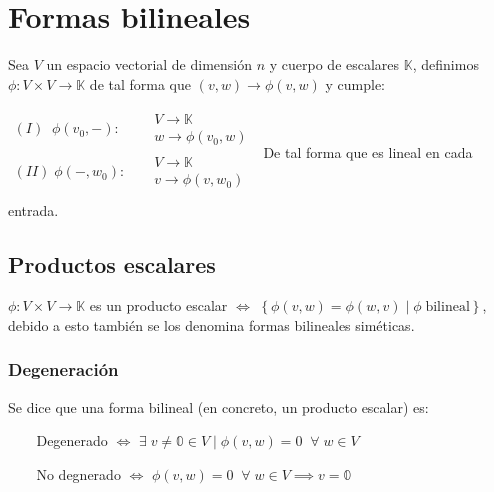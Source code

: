 \documentclass{preset}
\begin{document}
\section{Formas bilineales}
Sea $V$ un espacio vectorial de dimensión $n$ y cuerpo de escalares $\mathbb{K}$, definimos $\phi: V \times V \rightarrow \mathbb{K}$ de tal forma que $(v,w) \rightarrow \phi (v,w)$ y cumple:

\vspace{10pt}
\hspace{10pt}
$\begin{matrix}
(I)\;\; \phi(v_0,-) : && \begin{matrix}
            V \rightarrow \mathbb{K} \\
            w \rightarrow \phi(v_0,w) 
        \end{matrix} \\
(II)\; \phi(-,w_0) : && \begin{matrix}
            V \rightarrow \mathbb{K} \\
            v \rightarrow \phi(v,w_0) 
        \end{matrix} \\
\end{matrix}$
\hspace{10pt}
De tal forma que es lineal en cada entrada.

\vspace{-15pt}
\subsection{Productos escalares}
$\phi: V \times V \rightarrow \mathbb{K}$ es un producto escalar $\iff$ $\left\{\phi (v,w)=\phi (w,v) \;\vert\; \phi \; \mbox{bilineal}\right\}$, debido a esto también se los denomina formas bilineales siméticas.

\vspace{-15pt}
\subsubsection{Degeneración}
Se dice que una forma bilineal (en concreto, un producto escalar) es:

\vspace{-10pt}
\begin{itemize}
	\item[$ $] Degenerado  \;\;  $\iff$ $\exists \; v \neq \mathbb{0} \in V \; \vert \; \phi(v,w) = 0 \;\; \forall \; w \in V$
	\vspace{-10pt}
    \item[$ $] No degnerado  $\iff$ $\phi(v,w) = 0 \;\; \forall \; w \in V \implies v=\mathbb{0}$
\end{itemize} 
\end{document}
